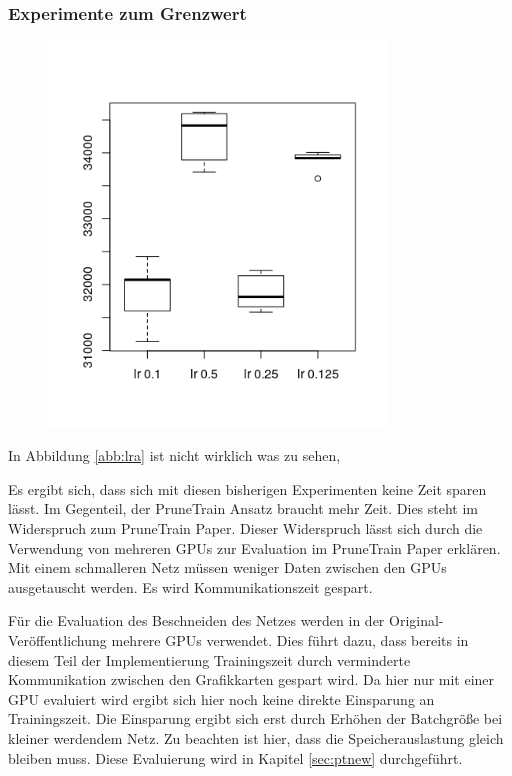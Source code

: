  \subsubsection{Experimente zum Grenzwert}


\begin{figure}[h]
 \centering
 \includegraphics[width=0.8\textwidth]{KapitelPartB/Images/lr1.png}
 \label{ref:lra}
\end{figure}

 In Abbildung \ref{abb:lra} ist nicht wirklich was zu sehen, 
 
 
 
Es ergibt sich, dass sich mit diesen bisherigen Experimenten keine Zeit sparen lässt. Im Gegenteil, der PruneTrain Ansatz braucht mehr Zeit. Dies steht im Widerspruch zum PruneTrain Paper. Dieser Widerspruch lässt sich durch die Verwendung von mehreren GPUs zur Evaluation im PruneTrain Paper erklären. Mit einem schmalleren Netz müssen weniger Daten zwischen den GPUs ausgetauscht werden. Es wird Kommunikationszeit gespart.


\color{blue1}
Für die Evaluation des Beschneiden des Netzes werden in der Original-Veröffentlichung mehrere GPUs verwendet. Dies führt dazu, dass bereits in diesem Teil der Implementierung Trainingszeit durch verminderte Kommunikation zwischen den Grafikkarten gespart wird. Da hier nur mit einer GPU evaluiert wird ergibt sich hier noch keine direkte Einsparung an Trainingszeit. Die Einsparung ergibt sich erst durch Erhöhen der Batchgröße bei kleiner werdendem Netz. Zu beachten ist hier, dass die Speicherauslastung gleich bleiben muss. Diese Evaluierung wird in Kapitel \ref{sec:ptnew} durchgeführt.


